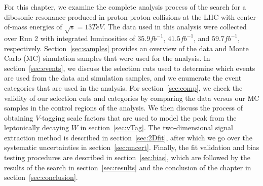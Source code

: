 For this chapter, we examine the complete analysis process of the search for a dibosonic resonance produced in proton-proton collisions at the LHC with center-of-mass energies of $\sqrt{s}=13\unit{TeV}$.
The data used in this analysis were collected over Run 2 with integrated luminosities of $35.9\unit{fb^{-1}}$, $41.5\unit{fb^{-1}}$, and $59.7\unit{fb^{-1}}$, respectively.
Section~\ref{sec:samples} provides an overview of the data and Monte Carlo (MC) simulation samples that were used for the analysis.
In section~\ref{sec:events}, we discuss the selection cuts used to determine which events are used from the data and simulation samples, and we enumerate the event categories that are used in the analysis.
For section~\ref{sec:comp}, we check the validity of our selection cuts and categories by comparing the data versus our MC samples in the control regions of the analysis.
We then discuss the process of obtaining $V$-tagging scale factors that are used to model the peak from the leptonically decaying $W$ in section~\ref{sec:vTag}.
The two-dimensional signal extraction method is described in section~\ref{sec:2Dfit}, after which we go over the systematic uncertainties in section~\ref{sec:uncert}.
Finally, the fit validation and bias testing procedures are described in section~\ref{sec:bias}, which are followed by the results of the search in section~\ref{sec:results} and the conclusion of the chapter in section~\ref{sec:conclusion}.

